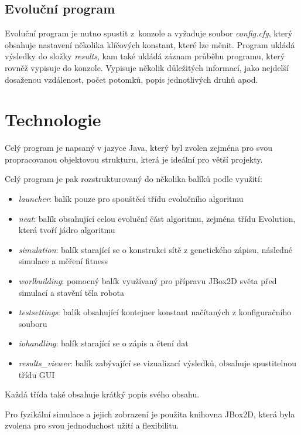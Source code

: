 \documentclass[a4]{article}
\begin{document}
\subsection{Evoluční program}
Evoluční program je nutno spustit z~konzole a vyžaduje soubor \emph{config.cfg}, který obsahuje nastavení několika klíčových konstant, které lze měnit. Program ukládá výsledky do složky \emph{results}, kam také ukládá záznam průběhu programu, který rovněž vypisuje do konzole. Vypisuje několik důležitých informací, jako nejdelší dosaženou vzdálenost, počet potomků, popis jednotlivých druhů apod.
\section{Technologie}
Celý program je napsaný v jazyce Java, který byl zvolen zejména pro svou propracovanou objektovou strukturu, která je ideální pro větší projekty. \par Celý program je pak rozstrukturovaný do několika balíků podle využití:
\begin{itemize}
\item{\emph{launcher}: balík pouze pro spouštěcí třídu evolučního algoritmu}
\item{\emph{neat}: balík obsahující celou evoluční část algoritmu, zejména třídu Evolution, která tvoří jádro algoritmu}
\item{\emph{simulation}: balík starající se o konstrukci sítě z genetického zápisu, následné simulace a měření fitness}
\item{\emph{worlbuilding}: pomocný balík využívaný pro přípravu JBox2D světa před simulací a stavění těla robota}
\item{\emph{testsettings}: balík obsahující kontejner konstant načítaných z konfiguračního souboru}
\item{\emph{iohandling}: balík starající se o zápis a čtení dat}
\item{\emph{results\_viewer}: balík zabývající se vizualizací výsledků, obsahuje spustitelnou třídu GUI}
\end{itemize}
Každá třída také obsahuje krátký popis svého obsahu.\par
Pro fyzikální simulace a jejich zobrazení je použita knihovna JBox2D\cite{jbox2D}, která byla zvolena pro svou jednoduchost užití a flexibilitu.
\end{document}
